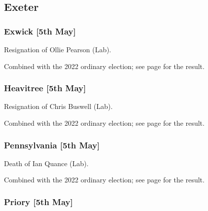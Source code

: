 \documentclass[a4paper,openany]{book}
\begin{document}
\begin{resultsiii}
\subsection*{Exeter}

\subsubsection*{Exwick \hspace*{\fill}\nolinebreak[1]%
	\enspace\hspace*{\fill}
	[5th May]}


Resignation of Ollie Pearson (Lab).

Combined with the 2022 ordinary election; see page \pageref{ExeterExwick} for the result.

\subsubsection*{Heavitree \hspace*{\fill}\nolinebreak[1]%
	\enspace\hspace*{\fill}
	[5th May]}


Resignation of Chris Buswell (Lab).

Combined with the 2022 ordinary election; see page \pageref{ExeterHeavitree} for the result.

\subsubsection*{Pennsylvania \hspace*{\fill}\nolinebreak[1]%
	\enspace\hspace*{\fill}
	[5th May]}


Death of Ian Quance (Lab).

Combined with the 2022 ordinary election; see page \pageref{ExeterPennsylvania} for the result.

\subsubsection*{Priory \hspace*{\fill}\nolinebreak[1]%
	\enspace\hspace*{\fill}
	[5th May]}


\end{resultsiii}
\end{document}

